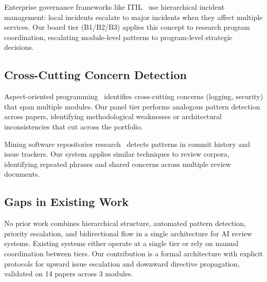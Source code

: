 Enterprise governance frameworks like ITIL~\cite{axelos2019itil} use hierarchical incident management: local incidents escalate to major incidents when they affect multiple services. Our board tier (B1/B2/B3) applies this concept to research program coordination, escalating module-level patterns to program-level strategic decisions.

\subsection{Cross-Cutting Concern Detection}

Aspect-oriented programming~\cite{kiczales1997aspect} identifies cross-cutting concerns (logging, security) that span multiple modules. Our panel tier performs analogous pattern detection across papers, identifying methodological weaknesses or architectural inconsistencies that cut across the portfolio.

Mining software repositories research~\cite{hassan2008road} detects patterns in commit history and issue trackers. Our system applies similar techniques to review corpora, identifying repeated phrases and shared concerns across multiple review documents.

\subsection{Gaps in Existing Work}

No prior work combines hierarchical structure, automated pattern detection, priority escalation, and bidirectional flow in a single architecture for AI review systems. Existing systems either operate at a single tier or rely on manual coordination between tiers. Our contribution is a formal architecture with explicit protocols for upward issue escalation and downward directive propagation, validated on 14 papers across 3 modules.